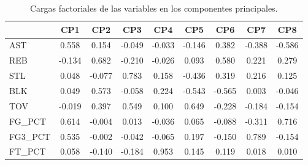 \begin{table}[h]
\centering
\caption{Cargas factoriales de las variables en los componentes principales.}
\label{tab:pca_cargas}
\begin{tabular}{lcccccccc}
\toprule
 & CP1 & CP2 & CP3 & CP4 & CP5 & CP6 & CP7 & CP8 \\
\midrule
AST & 0.558 & 0.154 & -0.049 & -0.033 & -0.146 & 0.382 & -0.388 & -0.586 \\
REB & -0.134 & 0.682 & -0.210 & -0.026 & 0.093 & 0.580 & 0.221 & 0.279 \\
STL & 0.048 & -0.077 & 0.783 & 0.158 & -0.436 & 0.319 & 0.216 & 0.125 \\
BLK & 0.049 & 0.573 & -0.058 & 0.224 & -0.543 & -0.565 & 0.003 & -0.046 \\
TOV & -0.019 & 0.397 & 0.549 & 0.100 & 0.649 & -0.228 & -0.184 & -0.154 \\
FG\_PCT & 0.614 & -0.004 & 0.013 & -0.036 & 0.065 & -0.088 & -0.311 & 0.716 \\
FG3\_PCT & 0.535 & -0.002 & -0.042 & -0.065 & 0.197 & -0.150 & 0.789 & -0.154 \\
FT\_PCT & 0.058 & -0.140 & -0.184 & 0.953 & 0.145 & 0.119 & 0.018 & 0.010 \\
\bottomrule
\end{tabular}
\end{table}
